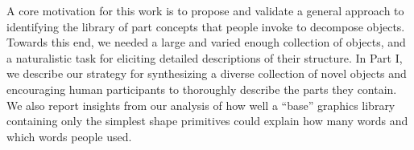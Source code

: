 \documentclass[10pt,letterpaper]{article}
\begin{document}




A core motivation for this work is to propose and validate a general approach to identifying the library of part concepts that people invoke to decompose objects. 
Towards this end, we needed a large and varied enough collection of objects, and a naturalistic task for eliciting detailed descriptions of their structure. 
In Part I, we describe our strategy for synthesizing a diverse collection of novel objects and encouraging human participants to thoroughly describe the parts they contain. 
We also report insights from our analysis of how well a ``base'' graphics library containing only the simplest shape primitives could explain how many words and which words people used.

\end{document}
